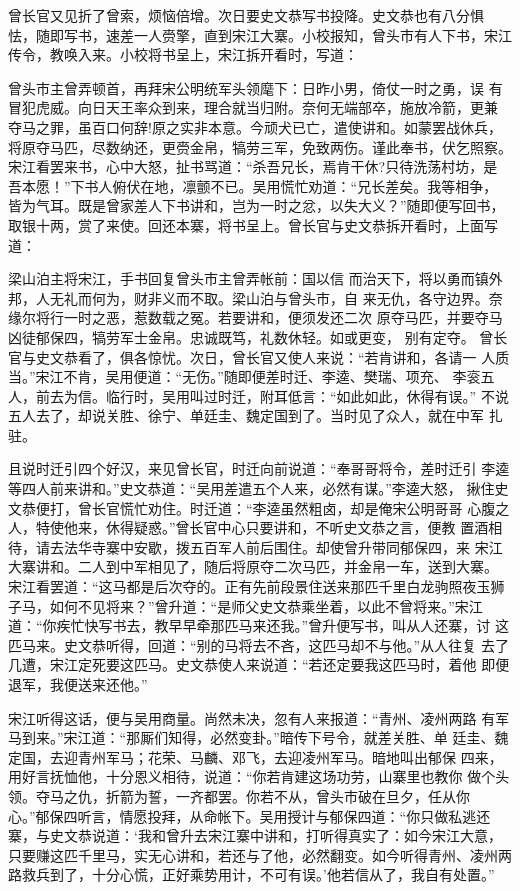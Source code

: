 曾长官又见折了曾索，烦恼倍增。次日要史文恭写书投降。史文恭也有八分惧
怯，随即写书，速差一人赍擎，直到宋江大寨。小校报知，曾头市有人下书，宋江
传令，教唤入来。小校将书呈上，宋江拆开看时，写道：

曾头市主曾弄顿首，再拜宋公明统军头领麾下：日昨小男，倚仗一时之勇，误
有冒犯虎威。向日天王率众到来，理合就当归附。奈何无端部卒，施放冷箭，更兼
夺马之罪，虽百口何辞!原之实非本意。今顽犬已亡，遣使讲和。如蒙罢战休兵，
将原夺马匹，尽数纳还，更赍金帛，犒劳三军，免致两伤。谨此奉书，伏乞照察。
宋江看罢来书，心中大怒，扯书骂道：“杀吾兄长，焉肯干休?只待洗荡村坊，是
吾本愿！”下书人俯伏在地，凛颤不已。吴用慌忙劝道：“兄长差矣。我等相争，
皆为气耳。既是曾家差人下书讲和，岂为一时之忿，以失大义？”随即便写回书，
取银十两，赏了来使。回还本寨，将书呈上。曾长官与史文恭拆开看时，上面写道：

梁山泊主将宋江，手书回复曾头市主曾弄帐前：国以信
而治天下，将以勇而镇外邦，人无礼而何为，财非义而不取。梁山泊与曾头市，自
来无仇，各守边界。奈缘尔将行一时之恶，惹数载之冤。若要讲和，便须发还二次
原夺马匹，并要夺马凶徒郁保四，犒劳军士金帛。忠诚既笃，礼数休轻。如或更变，
别有定夺。
曾长官与史文恭看了，俱各惊忧。次日，曾长官又使人来说：“若肯讲和，各请一
人质当。”宋江不肯，吴用便道：“无伤。”随即便差时迁、李逵、樊瑞、项充、
李衮五人，前去为信。临行时，吴用叫过时迁，附耳低言：“如此如此，休得有误。”
不说五人去了，却说关胜、徐宁、单廷圭、魏定国到了。当时见了众人，就在中军
扎驻。

且说时迁引四个好汉，来见曾长官，时迁向前说道：“奉哥哥将令，差时迁引
李逵等四人前来讲和。”史文恭道：“吴用差遣五个人来，必然有谋。”李逵大怒，
揪住史文恭便打，曾长官慌忙劝住。时迁道：“李逵虽然粗卤，却是俺宋公明哥哥
心腹之人，特使他来，休得疑惑。”曾长官中心只要讲和，不听史文恭之言，便教
置酒相待，请去法华寺寨中安歇，拨五百军人前后围住。却使曾升带同郁保四，来
宋江大寨讲和。二人到中军相见了，随后将原夺二次马匹，并金帛一车，送到大寨。
宋江看罢道：“这马都是后次夺的。正有先前段景住送来那匹千里白龙驹照夜玉狮
子马，如何不见将来？”曾升道：“是师父史文恭乘坐着，以此不曾将来。”宋江
道：“你疾忙快写书去，教早早牵那匹马来还我。”曾升便写书，叫从人还寨，讨
这匹马来。史文恭听得，回道：“别的马将去不吝，这匹马却不与他。”从人往复
去了几遭，宋江定死要这匹马。史文恭使人来说道：“若还定要我这匹马时，着他
即便退军，我便送来还他。”

宋江听得这话，便与吴用商量。尚然未决，忽有人来报道：“青州、凌州两路
有军马到来。”宋江道：“那厮们知得，必然变卦。”暗传下号令，就差关胜、单
廷圭、魏定国，去迎青州军马；花荣、马麟、邓飞，去迎凌州军马。暗地叫出郁保
四来，用好言抚恤他，十分恩义相待，说道：“你若肯建这场功劳，山寨里也教你
做个头领。夺马之仇，折箭为誓，一齐都罢。你若不从，曾头市破在旦夕，任从你
心。”郁保四听言，情愿投拜，从命帐下。吴用授计与郁保四道：“你只做私逃还
寨，与史文恭说道：‘我和曾升去宋江寨中讲和，打听得真实了：如今宋江大意，
只要赚这匹千里马，实无心讲和，若还与了他，必然翻变。如今听得青州、凌州两
路救兵到了，十分心慌，正好乘势用计，不可有误。’他若信从了，我自有处置。”

